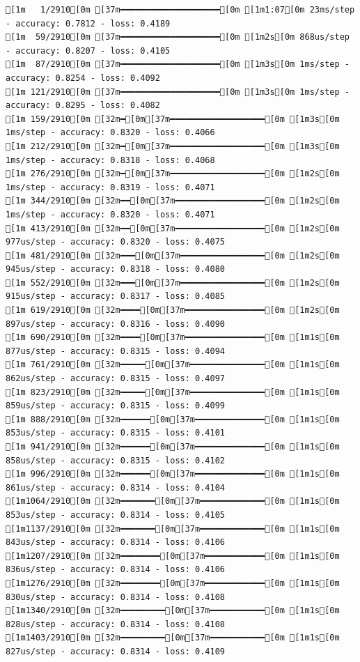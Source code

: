 \documentclass[
  letterpaper,
  DIV=11,
  numbers=noendperiod]{scrartcl}
\begin{document}
\begin{verbatim}
[1m   1/2910[0m [37m━━━━━━━━━━━━━━━━━━━━[0m [1m1:07[0m 23ms/step - accuracy: 0.7812 - loss: 0.4189
[1m  59/2910[0m [37m━━━━━━━━━━━━━━━━━━━━[0m [1m2s[0m 868us/step - accuracy: 0.8207 - loss: 0.4105 
[1m  87/2910[0m [37m━━━━━━━━━━━━━━━━━━━━[0m [1m3s[0m 1ms/step - accuracy: 0.8254 - loss: 0.4092  
[1m 121/2910[0m [37m━━━━━━━━━━━━━━━━━━━━[0m [1m3s[0m 1ms/step - accuracy: 0.8295 - loss: 0.4082
[1m 159/2910[0m [32m━[0m[37m━━━━━━━━━━━━━━━━━━━[0m [1m3s[0m 1ms/step - accuracy: 0.8320 - loss: 0.4066
[1m 212/2910[0m [32m━[0m[37m━━━━━━━━━━━━━━━━━━━[0m [1m3s[0m 1ms/step - accuracy: 0.8318 - loss: 0.4068
[1m 276/2910[0m [32m━[0m[37m━━━━━━━━━━━━━━━━━━━[0m [1m2s[0m 1ms/step - accuracy: 0.8319 - loss: 0.4071
[1m 344/2910[0m [32m━━[0m[37m━━━━━━━━━━━━━━━━━━[0m [1m2s[0m 1ms/step - accuracy: 0.8320 - loss: 0.4071
[1m 413/2910[0m [32m━━[0m[37m━━━━━━━━━━━━━━━━━━[0m [1m2s[0m 977us/step - accuracy: 0.8320 - loss: 0.4075
[1m 481/2910[0m [32m━━━[0m[37m━━━━━━━━━━━━━━━━━[0m [1m2s[0m 945us/step - accuracy: 0.8318 - loss: 0.4080
[1m 552/2910[0m [32m━━━[0m[37m━━━━━━━━━━━━━━━━━[0m [1m2s[0m 915us/step - accuracy: 0.8317 - loss: 0.4085
[1m 619/2910[0m [32m━━━━[0m[37m━━━━━━━━━━━━━━━━[0m [1m2s[0m 897us/step - accuracy: 0.8316 - loss: 0.4090
[1m 690/2910[0m [32m━━━━[0m[37m━━━━━━━━━━━━━━━━[0m [1m1s[0m 877us/step - accuracy: 0.8315 - loss: 0.4094
[1m 761/2910[0m [32m━━━━━[0m[37m━━━━━━━━━━━━━━━[0m [1m1s[0m 862us/step - accuracy: 0.8315 - loss: 0.4097
[1m 823/2910[0m [32m━━━━━[0m[37m━━━━━━━━━━━━━━━[0m [1m1s[0m 859us/step - accuracy: 0.8315 - loss: 0.4099
[1m 888/2910[0m [32m━━━━━━[0m[37m━━━━━━━━━━━━━━[0m [1m1s[0m 853us/step - accuracy: 0.8315 - loss: 0.4101
[1m 941/2910[0m [32m━━━━━━[0m[37m━━━━━━━━━━━━━━[0m [1m1s[0m 858us/step - accuracy: 0.8315 - loss: 0.4102
[1m 996/2910[0m [32m━━━━━━[0m[37m━━━━━━━━━━━━━━[0m [1m1s[0m 861us/step - accuracy: 0.8314 - loss: 0.4104
[1m1064/2910[0m [32m━━━━━━━[0m[37m━━━━━━━━━━━━━[0m [1m1s[0m 853us/step - accuracy: 0.8314 - loss: 0.4105
[1m1137/2910[0m [32m━━━━━━━[0m[37m━━━━━━━━━━━━━[0m [1m1s[0m 843us/step - accuracy: 0.8314 - loss: 0.4106
[1m1207/2910[0m [32m━━━━━━━━[0m[37m━━━━━━━━━━━━[0m [1m1s[0m 836us/step - accuracy: 0.8314 - loss: 0.4106
[1m1276/2910[0m [32m━━━━━━━━[0m[37m━━━━━━━━━━━━[0m [1m1s[0m 830us/step - accuracy: 0.8314 - loss: 0.4108
[1m1340/2910[0m [32m━━━━━━━━━[0m[37m━━━━━━━━━━━[0m [1m1s[0m 828us/step - accuracy: 0.8314 - loss: 0.4108
[1m1403/2910[0m [32m━━━━━━━━━[0m[37m━━━━━━━━━━━[0m [1m1s[0m 827us/step - accuracy: 0.8314 - loss: 0.4109

\end{verbatim}
\end{document}

